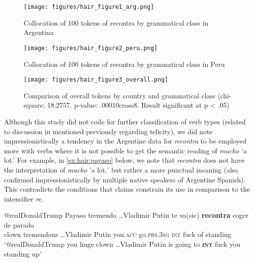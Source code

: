 \documentclass[output=paper,colorlinks,citecolor=brown,
]{langscibook}
\begin{document}
\newpage

\begin{figure}
    
    \texttt{[image: figures/hair\_figure1\_arg.png]}
    \caption{Collocation of 100 tokens of recontra by grammatical class in Argentina}
    \label{fig:hair:1}
\end{figure}

\begin{figure}
    
    \texttt{[image: figures/hair\_figure2\_peru.png]}
    \caption{Collocation of 100 tokens of recontra by grammatical class in Peru}
    \label{fig:hair:2}
\end{figure}

\begin{figure}
    
    \texttt{[image: figures/hair\_figure3\_overall.png]}
    \caption{Comparison of overall tokens by country and grammatical class (chi-square: 18.2757. p-value: .00010cross8. Result significant at p < .05)}
    \label{fig:hair:3}
\end{figure}

\newpage


Although this study did not code for further classification of verb types (related to discussion in \citealt{kornfeld2012cuantificacion} mentioned previously regarding telicity), we did note impressionistically a tendency in the Argentine data for \textit{recontra} to be employed more with verbs where it is not possible to get the semantic reading of \textit{mucho} `a lot.' For example, in \ref{ex:hair:payaso} below, we note that \textit{recontra} does not have the interpretation of \textit{mucho} 'a lot,' but rather a more punctual meaning (also confirmed impressionistically by multiple native speakers of Argentine Spanish). This contradicts the conditions that \citet{kornfeld2012cuantificacion} claims constrain its use in comparison to the intensifier \textit{re}.

\begin{exe}
\ex\label{ex:hair:payaso}
\gll @realDonaldTrump Payaso tremendo \ldots Vladimir Putin te va(sic) \textbf{recontra} coger de parado\\
[username] clown tremendous \ldots Vladimir Putin you.\textsc{acc} go.\textsc{prs.3sg} \textsc{int} fuck of standing\\
\glt `@realDonaldTrump you huge clown \ldots Vladimir Putin is going to \textbf{\textsc{int}} fuck you standing up' \citep{Twitter:Whatareyoudoing2018}
\end{exe}
\end{document}
